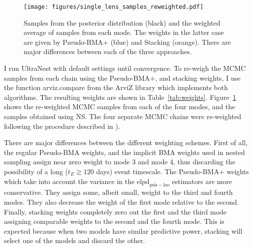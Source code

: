 \documentclass[12pt,dvipsnames]{report}
\newcommand{\ssf}[1]{\textsf{#1}}
\begin{document}
\begin{figure}[t]
    \begin{centering}
        \texttt{[image: figures/single\_lens\_samples\_reweighted.pdf]}
        \caption{
            Samples from the posterior distribution (black) and the weighted average 
            of samples from each mode. The weights in the latter case are given 
            by Pseudo-BMA+ (blue) and Stacking (orange). There are major differences 
            between each of the three approaches.
        }
            \label{fig:ogle_lightcurve_fit_samples_reweighted}
    \end{centering}
\end{figure}

I run \ssf{UltraNest} with default settings until convergence. 
To re-weigh the MCMC samples from each chain using the Pseudo-BMA+, and stacking 
weights, I use the function \ssf{arviz.compare} from the \ssf{ArviZ} library which 
implements both algorithms. The resulting weights are shown in Table~\ref{tab:weights}.
Figure~\ref{fig:ogle_lightcurve_fit_samples_reweighted} shows the re-weighted MCMC
samples from each of the four modes, and the samples obtained using NS. The four 
separate MCMC chains were re-weighted following the procedure described in 
\citet{arXiv:2006.12335}).

There are major differences between the different weighting schemes.
First of all, the regular Pseudo-BMA weights, and the implicit 
BMA weights used in nested sampling assign near zero weight to mode 3 and mode 4, 
thus discarding the possibility of a long ($t_E\gtrsim 120$ days) event 
timescale. The Pseudo-BMA+ weights which take into account 
the variance in the $\mathrm{elpd}_\mathrm{psis-loo}$ estimators are more conservative. 
They assign some, albeit small, weight to the third and fourth modes. They also 
decrease the weight of the first mode relative to the second.
Finally, stacking weights completely zero out the first and the third mode assigning 
comparable weights to the second and the fourth mode.
This is expected because when two models have similar predictive power, stacking 
will select one of the models and discard the other. 
\end{document}
